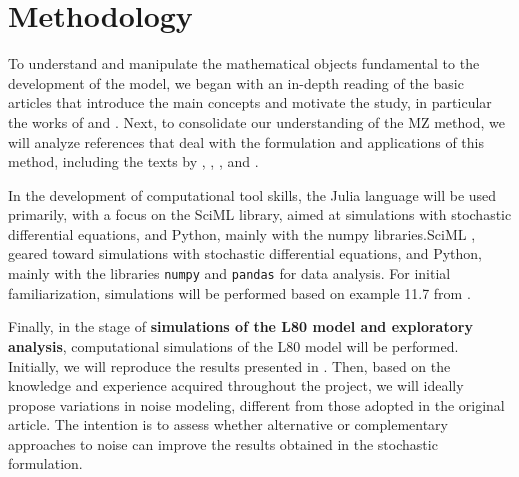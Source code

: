\documentclass[12pt]{article}
\begin{document}
\section*{Methodology}
To understand and manipulate the mathematical objects fundamental to the development of the model, we began with an in-depth reading of the basic articles that introduce the main concepts and motivate the study, in particular the works of \citet{Chekroun2017} and \citet{Chekroun2021}. Next, to consolidate our understanding of the MZ method, we will analyze references that deal with the formulation and applications of this method, including the texts by \citet{Gouasmi2017}, \citet{Chorin2000}, \citet{Chorin2002}, and \citet{Chorin2013}.

In the development of computational tool skills, the Julia language will be used primarily, with a focus on the SciML library, aimed at simulations with stochastic differential equations, and Python, mainly with the numpy libraries.{SciML} \citep{SDEJulia}, geared toward simulations with stochastic differential equations, and Python, mainly with the libraries \texttt{numpy} and \texttt{pandas} for data analysis. For initial familiarization, simulations will be performed based on example 11.7 from \citep[p.~169]{Pavliotis2008}.

Finally, in the stage of \textbf{simulations of the L80 model and exploratory analysis}, computational simulations of the L80 model will be performed. Initially, we will reproduce the results presented in \citet{Chekroun2021}. Then, based on the knowledge and experience acquired throughout the project, we will ideally propose variations in noise modeling, different from those adopted in the original article. The intention is to assess whether alternative or complementary approaches to noise can improve the results obtained in the stochastic formulation.
\end{document}
